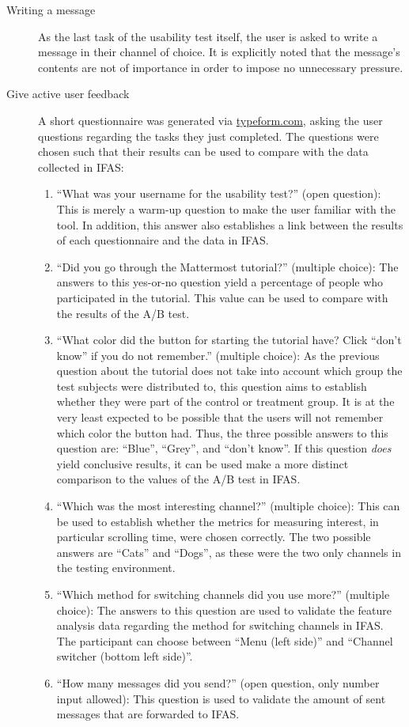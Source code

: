 \begin{description}
\item [Writing a message] As the last task of the usability test itself, the user is asked to write a message in their channel of choice.
It is explicitly noted that the message's contents are not of importance in order to impose no unnecessary pressure.

\item [Give active user feedback] A short questionnaire was generated via \url{typeform.com}, asking the user questions regarding the tasks they just completed.
The questions were chosen such that their results can be used to compare with the data collected in \ac{IFAS}:

\begin{enumerate}
\item ``What was your username for the usability test?'' (open question):
This is merely a warm-up question to make the user familiar with the tool.
In addition, this answer also establishes a link between the results of each questionnaire and the data in \ac{IFAS}.
\item ``Did you go through the Mattermost tutorial?'' (multiple choice):
The answers to this yes-or-no question yield a percentage of people who participated in the tutorial.
This value can be used to compare with the results of the A/B test.
\item ``What color did the button for starting the tutorial have? Click ``don't know'' if you do not remember.'' (multiple choice):
As the previous question about the tutorial does not take into account which group the test subjects were distributed to, this question aims to establish whether they were part of the control or treatment group.
It is at the very least expected to be possible that the users will not remember which color the button had.
Thus, the three possible answers to this question are: ``Blue'', ``Grey'', and ``don't know''.
If this question \emph{does} yield conclusive results, it can be used make a more distinct comparison to the values of the A/B test in \ac{IFAS}.
\item ``Which was the most interesting channel?'' (multiple choice):
This can be used to establish whether the metrics for measuring interest, in particular scrolling time, were chosen correctly.
The two possible answers are ``Cats'' and ``Dogs'', as these were the two only channels in the testing environment.
\item ``Which method for switching channels did you use more?'' (multiple choice):
The answers to this question are used to validate the feature analysis data regarding the method for switching channels in \ac{IFAS}.
The participant can choose between ``Menu (left side)'' and ``Channel switcher (bottom left side)''.
\item ``How many messages did you send?'' (open question, only number input allowed):
This question is used to validate the amount of sent messages that are forwarded to \ac{IFAS}.
\end{enumerate}

\end{description}

